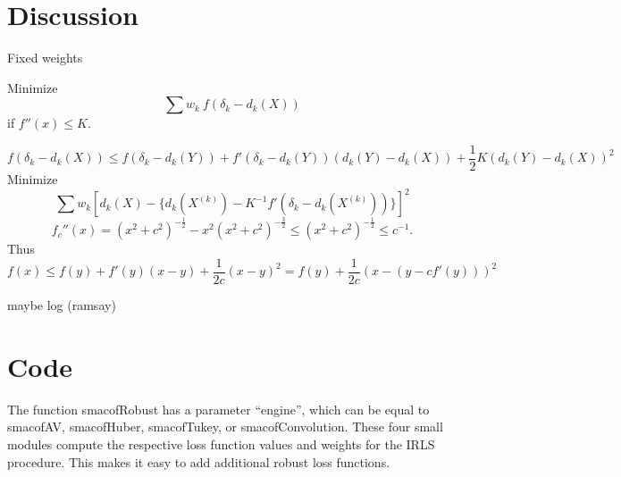 \documentclass[
  12pt,
  letterpaper,
  DIV=11,
  numbers=noendperiod]{scrartcl}
\begin{document}
\section{Discussion}\label{discussion}

Fixed weights

Minimize \[
\sum w_k\ f(\delta_k-d_k(X))
\] if \(f''(x)\leq K\).

\[
f(\delta_k-d_k(X))\leq f(\delta_k-d_k(Y))+f'(\delta_k-d_k(Y))(d_k(Y)-d_k(X))+\frac12K(d_k(Y)-d_k(X))^2
\] Minimize \[
\sum w_k\left[d_k(X)-\{d_k(X^{(k)})-K^{-1}f'(\delta_k-d_k(X^{(k)}))\}\right]^2
\] \[
f_c''(x)=(x^2 + c^2)^{-\frac12}-x^2(x^2 + c^2)^{-\frac32}\leq(x^2 + c^2)^{-\frac12}\leq c^{-1}.
\] Thus \[
f(x)\leq f(y)+f'(y)(x-y)+\frac{1}{2c}(x-y)^2=f(y)+\frac{1}{2c}(x-(y-cf'(y)))^2
\]

maybe log (ramsay)

\section{Code}\label{code}

The function smacofRobust has a parameter ``engine'', which can be equal
to smacofAV, smacofHuber, smacofTukey, or smacofConvolution. These four
small modules compute the respective loss function values and weights
for the IRLS procedure. This makes it easy to add additional robust loss
functions.
\end{document}
